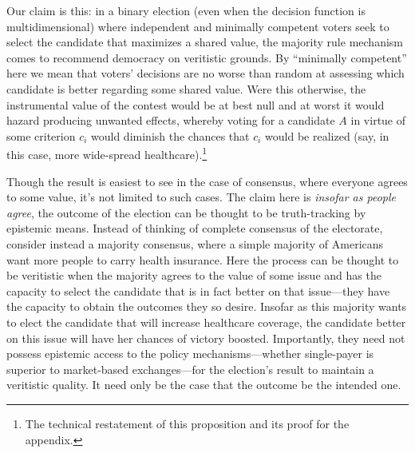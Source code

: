 \documentclass[11pt]{article}
\begin{document}
Our claim is this: in a binary election (even when the decision function is multidimensional) where independent and minimally competent voters seek to select the candidate that maximizes a shared value, the majority rule mechanism comes to recommend democracy on veritistic grounds. %
By ``minimally competent'' here we mean that voters' decisions are no worse than random at assessing which candidate is better regarding some shared value. Were this otherwise, the instrumental value of the contest would be at best null and at worst it would hazard producing unwanted effects, whereby voting for a candidate $A$ in virtue of some criterion $c_i$ would diminish the chances that $c_i$ would be realized (say, in this case, more wide-spread healthcare).\footnote{The technical restatement of this proposition and its proof for the appendix.}

Though the result is easiest to see in the case of consensus, where everyone agrees to some value, it's not limited to such cases. The claim here is \emph{insofar as people agree}, the outcome of the election can be thought to be truth-tracking by epistemic means.  Instead of thinking of complete consensus of the electorate, consider instead a majority consensus, where a simple majority of Americans want more people to carry health insurance. 
 Here the process can be thought to be veritistic when the majority agrees to the value of some issue and has the capacity to select the candidate that is in fact better on that issue---they have the capacity to obtain the outcomes they so desire. Insofar as this majority wants to elect the candidate that will increase healthcare coverage, the candidate better on this issue will have her chances of victory boosted. Importantly, they need not possess epistemic access to the policy mechanisms---whether single-payer is superior to market-based exchanges---for the election's result to maintain a veritistic quality. It need only be the case that the outcome be the intended one.
 
\end{document}
